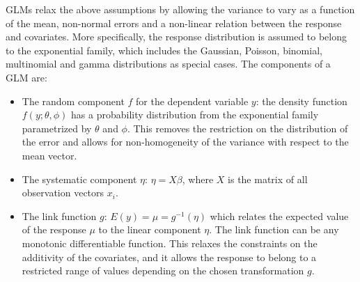 
GLMs relax the above assumptions by allowing the variance to vary as a function of the mean, non-normal errors and a non-linear relation between the response and covariates. More specifically, the response distribution is assumed to belong to the exponential family, which includes the Gaussian, Poisson, binomial, multinomial and gamma distributions as special cases. The components of a GLM are:
\begin{itemize}
\item The random component $f$ for the dependent variable $y$: the density function $f(y;\theta,\phi)$ has a probability distribution from the exponential family parametrized by $\theta$ and $\phi$. This removes the restriction on the distribution of the error and allows for non-homogeneity of the variance with respect to the mean vector.
\item The systematic component $\eta$: $\eta = X\beta$, where $X$ is the matrix of all observation vectors $x_i$.
\item The link function $g$: $E(y) = \mu = g^{-1}(\eta)$ which relates the expected value of the response $\mu$ to the linear component $\eta$. The link function can be any monotonic differentiable function. This relaxes the constraints on the additivity of the covariates, and it allows the response to belong to a restricted range of values depending on the chosen transformation $g$.
\end{itemize}


